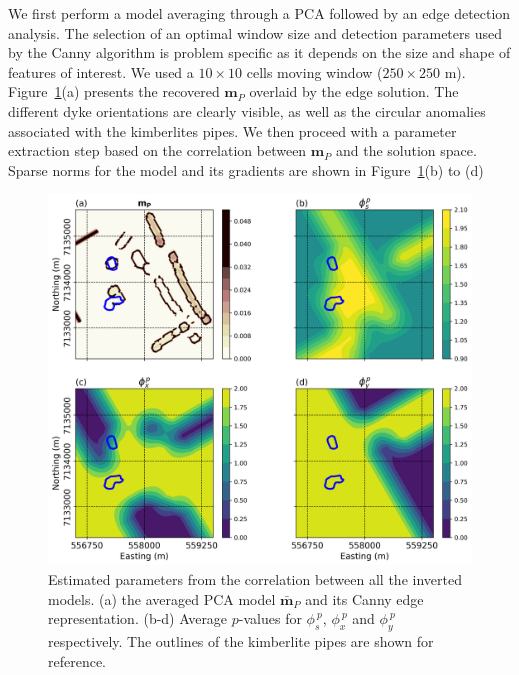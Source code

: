 \documentclass[extra,referee]{gji}
\begin{document}
We first perform a model averaging through a PCA followed by an edge detection analysis. The selection of an optimal window size and detection parameters used by the Canny algorithm is problem specific as it depends on the size and shape of features of interest. We used a $10\times 10$ cells moving window ($250\times250$ m). Figure~\ref{TKC_Params}(a) presents the recovered $\mathbf{m}_P$ overlaid by the edge solution. The different dyke orientations are clearly visible, as well as the circular anomalies associated with the kimberlites pipes. We then proceed with a parameter extraction step based on the correlation between $\mathbf{m}_P$ and the solution space. Sparse norms for the model and its gradients are shown in Figure~\ref{TKC_Params}(b) to (d)
\begin{figure}
\includegraphics[width=\columnwidth]{Figures/MAG_TKC_LocalParam.png}
\caption{Estimated parameters from the correlation between all the inverted models. (a) the averaged PCA model $\mathbf{\bar m}_P$ and its Canny edge representation. (b-d) Average $p$-values for $\phi_s^{\:p}$, $\phi_x^{\:p}$ and $\phi_y^{\:p}$ respectively. The outlines of the kimberlite pipes are shown for reference.}
\label{TKC_Params}
\end{figure}
\end{document}
